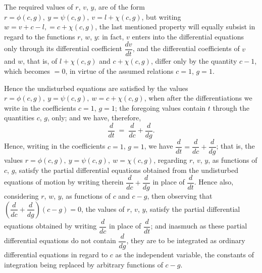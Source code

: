 \documentclass[11pt]{article}
\begin{document}
The required values of $r$, $v$, $y$, are of the form
$r = \phi(c,g),\ y = \psi(c,g),\ v = l + \chi(c,g)$, but writing
$w = v + c - l, = c + \chi(c,g)$, the last mentioned property will
equally subsist in regard to the functions $r$, $w$, $y$: in fact, $v$
enters into the differential equations only through its differential
coefficient $\dfrac{dv}{dt}$, and the differential coefficients of $v$
and $w$, that is, of $l + \chi(c,g)$ and $c + \chi(c,g)$, differ only
by the quantity $c - 1$, which becomes $=0$, in virtue of the assumed
relations $c = 1$, $g = 1$.

Hence the undisturbed equations are satisfied by the values
$r = \phi(c,g),\ y = \psi(c,g),\ w = c + \chi(c,g)$, when after the
differentiations we write in the coefficients $c = 1$, $g = 1$; the
foregoing values contain $t$ through the quantities $c$, $g$, only;
and we have, therefore,
\[
\frac{d}{dt} \;=\; \frac{d}{dc} + \frac{d}{dg}.
\]
Hence, writing in the coefficients $c = 1$, $g = 1$, we have
$\dfrac{d}{dt} = \dfrac{d}{dc} + \dfrac{d}{dg}$; that is, the values
$r = \phi(c,g),\ y = \psi(c,g),\ w = \chi(c,g)$, regarding $r$, $v$,
$y$, as functions of $c$, $g$, satisfy the partial differential
equations obtained from the undisturbed equations of motion by
writing therein $\dfrac{d}{dc} + \dfrac{d}{dg}$ in place of
$\dfrac{d}{dt}$. Hence also, considering $r$, $w$, $y$, as functions
of $c$ and $c - g$, then observing that $\left(\dfrac{d}{dc} + \dfrac{d}{dg}\right)(c-g) = 0$,
the values of $r$, $v$, $y$, satisfy the partial differential
equations obtained by writing $\dfrac{d}{dc}$ in place of
$\dfrac{d}{dt}$; and inasmuch as these partial differential equations
do not contain $\dfrac{d}{dg}$, they are to be integrated as ordinary
differential equations in regard to $c$ as the independent variable,
the constants of integration being replaced by arbitrary functions of
$c - g$.
\end{document}
